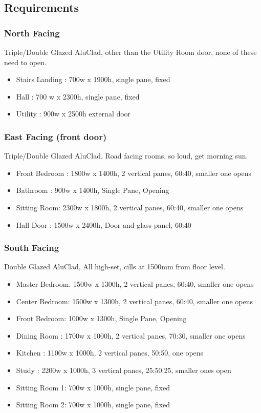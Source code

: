 \subsection{Requirements}
\subsubsection{North Facing}
Triple/Double Glazed AluClad, other than the Utility Room door, none of these need to open.
\begin{itemize}
\item Stairs Landing : 700w x 1900h, single pane, fixed
\item Hall : 700 w x 2300h, single pane, fixed
\item Utility : 900w x 2500h external door
\end{itemize}    
    
\subsubsection{East Facing (front door)}
Triple/Double Glazed AluClad. Road facing rooms, so loud, get morning sun.
\begin{itemize}
\item Front Bedroom : 1800w x 1400h, 2 vertical panes, 60:40, smaller one opens
\item Bathroom : 900w x 1400h, Single Pane, Opening
\item Sitting Room: 2300w x 1800h, 2 vertical panes, 60:40, smaller one opens
\item Hall Door : 1500w x 2400h, Door and glass panel, 60:40
    
\end{itemize}

\subsubsection{South Facing}
Double Glazed AluClad, All high-set, cills at 1500mm from floor level.
\begin{itemize}
\item Master Bedroom: 1500w x 1300h, 2 vertical panes, 60:40, smaller one opens
\item Center Bedroom: 1500w x 1300h, 2 vertical panes, 60:40, smaller one opens
\item Front Bedroom: 1000w x 1300h, Single Pane, Opening
\item Dining Room : 1700w x 1000h, 2 vertical panes, 70:30, smaller one opens
\item Kitchen : 1100w x 1000h, 2 vertical panes, 50:50, one opens
\item Study :   2200w x 1000h, 3 vertical panes, 25:50:25, smaller ones open
\item Sitting Room 1: 700w x 1000h, single pane, fixed
\item Sitting Room 2: 700w x 1000h, single pane, fixed
\end{itemize}

